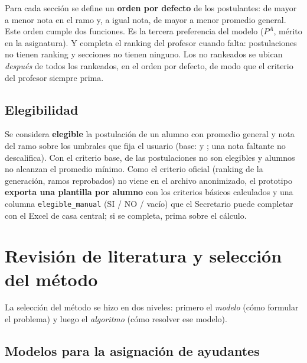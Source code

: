 \documentclass{article}
\begin{document}
Para cada sección se define un \textbf{orden por defecto} de los postulantes: de mayor a menor nota en el ramo y, a igual nota, de mayor a menor promedio general. Este orden cumple dos funciones. Es la tercera preferencia del modelo ($P^A$, mérito en la asignatura). Y completa el ranking del profesor cuando falta: \sinRankPost{} postulaciones no tienen ranking y \sinRankSecciones{} secciones no tienen ninguno. Los no rankeados se ubican \emph{después} de todos los rankeados, en el orden por defecto, de modo que el criterio del profesor siempre prima.

\subsection{Elegibilidad}
\label{sec:elegibilidad}

Se considera \textbf{elegible} la postulación de un alumno con promedio general y nota del ramo sobre los umbrales que fija el usuario (base: \elegPromMin{} y \elegNotaMin; una nota faltante no descalifica). Con el criterio base, \elegPostNo{} de las \elegPostTotal{} postulaciones no son elegibles y \elegAlumNoProm{} alumnos no alcanzan el promedio mínimo. Como el criterio oficial (ranking de la generación, ramos reprobados) no viene en el archivo anonimizado, el prototipo \textbf{exporta una plantilla por alumno} con los criterios básicos calculados y una columna \texttt{elegible\_manual} (SI / NO / vacío) que el Secretario puede completar con el Excel de casa central; si se completa, prima sobre el cálculo.

\section{Revisión de literatura y selección del método}
\label{sec:literatura}

La selección del método se hizo en dos niveles: primero el \emph{modelo} (cómo formular el problema) y luego el \emph{algoritmo} (cómo resolver ese modelo).

\subsection{Modelos para la asignación de ayudantes}
\end{document}
